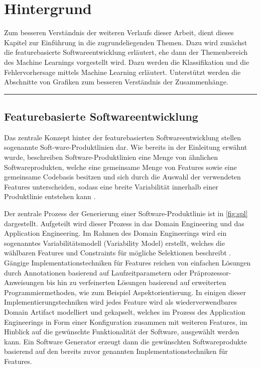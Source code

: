 
\chapter{Hintergrund}
\label{background}

Zum besseren Verständnis der weiteren Verlaufs dieser Arbeit, dient dieses Kapitel zur Einführung in die zugrundeliegenden Themen. Dazu wird zunächst die featurebasierte Softwareentwicklung erläutert, ehe dann der Themenbereich des Machine Learnings vorgestellt wird. Dazu werden die Klassifikation und die Fehlervorhersage mittels Machine Learning erläutert. Unterstützt werden die Abschnitte von Grafiken zum besseren Verständnis der Zusammenhänge.
\\
\hrule

\section{Featurebasierte Softwareentwicklung}
\label{feat-develop}

Das zentrale Konzept hinter der featurebasierten Softwareentwicklung stellen sogenannte Soft-ware-Produktlinien dar. Wie bereits in der Einleitung erwähnt wurde, beschreiben Software-Produktlinien eine Menge von ähnlichen Softwareprodukten, welche eine gemeinsame Menge von Features sowie eine gemeinsame Codebasis besitzen und sich durch die Auswahl der verwendeten Features unterscheiden, sodass eine breite Variabilität innerhalb einer Produktlinie entstehen kann \cite{Apel2013,Thuem2014}.

Der zentrale Prozess der Generierung einer Software-Produktlinie ist in \autoref{fig:spl} dargestellt. Aufgeteilt wird dieser Prozess in das Domain Engineering und das Application Engineering. Im Rahmen des Domain Engineerings wird ein sogenanntes Variabilitätsmodell (Variability Model) erstellt, welches die wählbaren Features und Constraints für mögliche Selektionen beschreibt \cite{Apel2013}. Gängige Implementationstechniken für Features reichen von einfachen Lösungen durch Annotationen basierend auf Laufzeitparametern oder Präprozessor-Anweisungen bis hin zu verfeinerten Lösungen basierend auf erweiterten Programmiermethoden, wie zum Beispiel Aspektorientierung. In einigen dieser Implementierungstechniken wird jedes Feature wird als wiederverwendbares Domain Artifact modelliert und gekapselt, welches im Prozess des Application Engineerings in Form einer Konfiguration zusammen mit weiteren Features, im Hinblick auf die gewünschte Funktionalität der Software, ausgewählt werden kann. Ein Software Generator erzeugt dann die gewünschten Softwareprodukte basierend auf den bereits zuvor genannten Implementationstechniken für Features.

